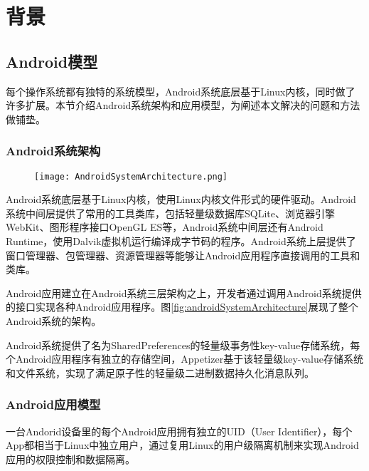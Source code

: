 
\chapter{背景}
\label{chap:background}

\section{Android模型}
\label{sec:androidModel}

每个操作系统都有独特的系统模型，Android系统底层基于Linux内核，同时做了许多扩展。本节介绍Android系统架构和应用模型，为阐述本文解决的问题和方法做铺垫。

\subsection{Android系统架构}

\begin{figure}[!htp]
	\centering
	\texttt{[image: AndroidSystemArchitecture.png]}
\end{figure}

Android系统底层基于Linux内核，使用Linux内核文件形式的硬件驱动。Android系统中间层提供了常用的工具类库，包括轻量级数据库SQLite、浏览器引擎WebKit、图形程序接口OpenGL ES等，Android系统中间层还有Android Runtime，使用Dalvik虚拟机运行编译成字节码的程序。Android系统上层提供了窗口管理器、包管理器、资源管理器等能够让Android应用程序直接调用的工具和类库。

Android应用建立在Android系统三层架构之上，开发者通过调用Android系统提供的接口实现各种Android应用程序。图\ref{fig:androidSystemArchitecture}展现了整个Android系统的架构。

Android系统提供了名为SharedPreferences的轻量级事务性key-value存储系统，每个Android应用程序有独立的存储空间，Appetizer基于该轻量级key-value存储系统和文件系统，实现了满足原子性的轻量级二进制数据持久化消息队列。

\subsection{Android应用模型}

一台Andorid设备里的每个Android应用拥有独立的UID（User Identifier），每个App都相当于Linux中独立用户，通过复用Linux的用户级隔离机制来实现Android应用的权限控制和数据隔离。

